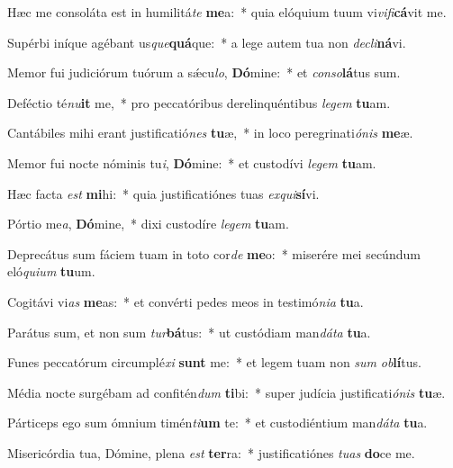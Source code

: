 \item Hæc me consoláta est in humilitá\textit{te} \textbf{me}a:~* quia elóquium tuum vi\textit{vi}\textit{fi}\textbf{cá}vit me.
\item Supérbi iníque agébant us\textit{que}\textbf{quá}que:~* a lege autem tua non \textit{de}\textit{cli}\textbf{ná}vi.
\item Memor fui judiciórum tuórum a sǽcu\textit{lo}, \textbf{Dó}mine:~* et \textit{con}\textit{so}\textbf{lá}tus sum.
\item Deféctio té\textit{nu}\textbf{it} me,~* pro peccatóribus derelinquéntibus \textit{le}\textit{gem} \textbf{tu}am.
\item Cantábiles mihi erant justificatió\textit{nes} \textbf{tu}æ,~* in loco peregrinati\textit{ó}\textit{nis} \textbf{me}æ.
\item Memor fui nocte nóminis tu\textit{i}, \textbf{Dó}mine:~* et custodívi \textit{le}\textit{gem} \textbf{tu}am.
\item Hæc facta \textit{est} \textbf{mi}hi:~* quia justificatiónes tuas \textit{ex}\textit{qui}\textbf{sí}vi.
\item Pórtio me\textit{a}, \textbf{Dó}mine,~* dixi custodíre \textit{le}\textit{gem} \textbf{tu}am.
\item Deprecátus sum fáciem tuam in toto cor\textit{de} \textbf{me}o:~* miserére mei secúndum eló\textit{qui}\textit{um} \textbf{tu}um.
\item Cogitávi vi\textit{as} \textbf{me}as:~* et convérti pedes meos in testimó\textit{ni}\textit{a} \textbf{tu}a.
\item Parátus sum, et non sum \textit{tur}\textbf{bá}tus:~* ut custódiam man\textit{dá}\textit{ta} \textbf{tu}a.
\item Funes peccatórum circumplé\textit{xi} \textbf{sunt} me:~* et legem tuam non \textit{sum} \textit{ob}\textbf{lí}tus.
\item Média nocte surgébam ad confitén\textit{dum} \textbf{ti}bi:~* super judícia justificati\textit{ó}\textit{nis} \textbf{tu}æ.
\item Párticeps ego sum ómnium timén\textit{ti}\textbf{um} te:~* et custodiéntium man\textit{dá}\textit{ta} \textbf{tu}a.
\item Misericórdia tua, Dómine, plena \textit{est} \textbf{ter}ra:~* justificatiónes \textit{tu}\textit{as} \textbf{do}ce me.
